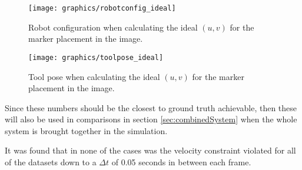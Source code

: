 \begin{figure}[H]
\centering
\texttt{[image: graphics/robotconfig\_ideal]}
\caption{Robot configuration when calculating the ideal $(u,v)$ for the marker placement in the image.}
\label{fig:robotconfig_ideal}
\end{figure}

\begin{figure}[H]
\centering
\texttt{[image: graphics/toolpose\_ideal]}
\caption{Tool pose when calculating the ideal $(u,v)$ for the marker placement in the image.}
\label{fig:toolpose_ideal}
\end{figure}


Since these numbers should be the closest to ground truth achievable, then these will also be used in comparisons in section \ref{sec:combinedSystem} when the whole system is brought together in the simulation.

It was found that in none of the cases was the velocity constraint violated for all of the datasets down to a $\Delta t$ of 0.05 seconds in between each frame.


